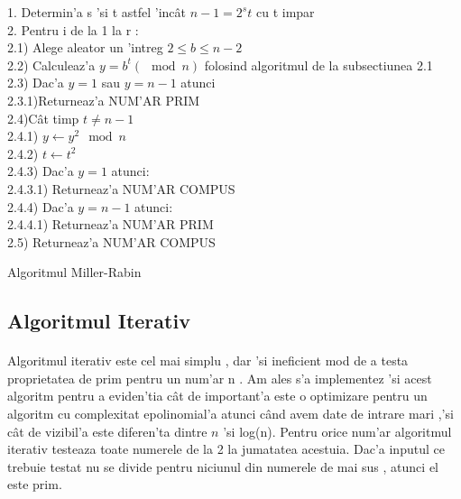 \documentclass[12pt,twoside]{article}
\newcommand\tab[1][1cm]{\hspace*{#1}}
\numberwithin{figure}{section}
\begin{document}
\begin{algorithm}
 

1. Determin'a s 'si t astfel 'inc\^at $n-1 = 2^st$ cu t impar\\
2. Pentru i de la 1 la r : \\
\tab 2.1) Alege aleator un 'intreg  $2 \leq b \leq n-2$ \\
\tab 2.2) Calculeaz'a $y = b^{t} (\mod n)$ folosind algoritmul de la subsectiunea 2.1 \\
\tab 2.3) Dac'a $y = 1 $ sau $y = n-1$ atunci \\
\tab \tab 2.3.1)Returneaz'a NUM'AR PRIM \\

\tab 2.4)C\^at timp $t \neq n-1$ \\
\tab \tab 2.4.1) $y \gets y^2 \mod n$ \\
\tab \tab 2.4.2) $t \gets t^2$ \\
\tab \tab 2.4.3) Dac'a $y = 1$ atunci:\\
\tab \tab \tab 2.4.3.1) Returneaz'a NUM'AR COMPUS \\
\tab \tab 2.4.4) Dac'a $y = n-1$ atunci: \\
\tab \tab \tab 2.4.4.1) Returneaz'a NUM'AR PRIM \\

\tab 2.5) Returneaz'a NUM'AR COMPUS


\caption{Algoritmul Miller-Rabin}
\end{algorithm}

\subsection{Algoritmul Iterativ}
\paragraph{}
Algoritmul iterativ este cel mai simplu , dar 'si ineficient mod de a testa proprietatea de prim pentru un num'ar n . Am ales s'a implementez 'si acest algoritm pentru a eviden'tia c\^at de important'a este o optimizare pentru un algoritm cu complexitat epolinomial'a atunci c\^and avem date de intrare mari ,'si c\^at de vizibil'a este diferen'ta dintre $n$ 'si log(n). 
Pentru orice num'ar algoritmul iterativ testeaza toate numerele de la 2 la jumatatea acestuia. Dac'a inputul ce trebuie testat nu se divide pentru niciunul din numerele de mai sus , atunci el este prim.
\end{document}
